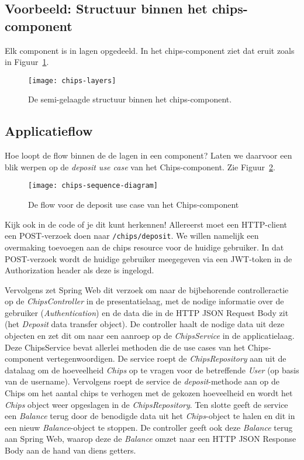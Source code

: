 \subsection{Voorbeeld: Structuur binnen het chips-component}
Elk component is in lagen opgedeeld. In het chips-component ziet 
dat eruit zoals in Figuur~\ref{fig:chips-layers}.

\begin{figure}[H]
    \centering
    \texttt{[image: chips-layers]}
    \caption{De semi-gelaagde structuur binnen het chips-component.}
    \label{fig:chips-layers}
\end{figure}

\subsection{Applicatieflow}
Hoe loopt de flow binnen de de lagen in een component? 
Laten we daarvoor een blik werpen 
op de \emph{deposit use case} van het Chips-component.
Zie Figuur~\ref{fig:chips-sequence-diagram}.

\begin{figure}[H]
    \centering
    \texttt{[image: chips-sequence-diagram]}
    \caption{De flow voor de deposit use case van het Chips-component}
    \label{fig:chips-sequence-diagram}
\end{figure}

Kijk ook in de code of je dit kunt herkennen!
Allereerst moet een HTTP-client een POST-verzoek doen naar 
\texttt{/chips/deposit}. We willen namelijk een overmaking toevoegen
aan de chips resource voor de huidige gebruiker. In dat POST-verzoek 
wordt de huidige gebruiker meegegeven via een JWT-token in de Authorization header
als deze is ingelogd. 

Vervolgens zet Spring Web dit verzoek om naar de bijbehorende 
controlleractie op de \emph{ChipsController} in de presentatielaag, met de
nodige informatie over de gebruiker (\emph{Authentication}) en de data die 
in de HTTP JSON Request Body zit (het \emph{Deposit} data transfer object).
De controller haalt de nodige data uit deze objecten en zet dit om naar 
een aanroep op de \emph{ChipsService} in de applicatielaag. 
Deze ChipsService bevat allerlei methoden die de use cases van 
het Chips-component vertegenwoordigen.
De service roept de \emph{ChipsRepository} aan uit de datalaag om de hoeveelheid
\emph{Chips} op te vragen voor de betreffende \emph{User} (op basis van de username). 
Vervolgens roept de service de \emph{deposit}-methode aan op de Chips om het aantal chips te verhogen met de 
gekozen hoeveelheid en wordt het \emph{Chips} object weer opgeslagen in de \emph{ChipsRepository}.
Ten slotte geeft de service een \emph{Balance} terug door de benodigde data uit het 
\emph{Chips}-object te halen en dit in een nieuw \emph{Balance}-object te stoppen.
De controller geeft ook deze \emph{Balance} terug aan Spring Web, waarop deze de 
\emph{Balance} omzet naar een HTTP JSON Response Body aan de hand van diens getters.

